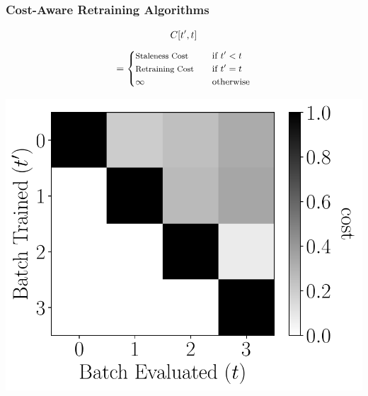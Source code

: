 \documentclass[pdf]{beamer}
\begin{document}
\begin{frame}[fragile]
    \frametitle{Cost-Aware Retraining Algorithms}
    \begin{tcbraster}[raster columns=2, raster left skip=-0.9cm,raster right skip=-0.9cm,raster before skip=0mm]
        \begin{tcolorbox}[nobeforeafter, title=Cost Matrix,,left=0mm,top=0mm,boxsep=0.5mm,alert=<1>]
            \begin{center}
            \begin{equation*}
                \small
                C[t^\prime,t]
            \end{equation*}
            \begin{align*}
                \small
                = \begin{cases}
                    \text{\footnotesize Staleness Cost} \quad& \text{\small if } t^\prime< t\\
                    \text{\footnotesize Retraining Cost} \quad& \text{\small if } t^\prime=t\\
                    \infty \quad&  \text{\small otherwise} 
                \end{cases}
            \end{align*}
        \end{center}
        \begin{center}
            \includegraphics[width=.78\textwidth]{figs/cost_matrix.pdf}
                    \end{center}
        \end{tcolorbox}
        \begin{tcolorbox}[nobeforeafter, title=Strategy,boxsep=0.5mm,left=0mm,alert=<2>]

\end{tcolorbox}
\end{tcbraster}
\end{frame}
\end{document}
